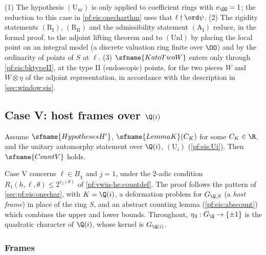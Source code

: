 \begin{remark}\label{pf:eis:countIrem}
(1) The hypothesis $(\mathrm{U}_{\mathrm{ur}})$ is only applied to coefficient rings with $e_\OO=1$; the reduction to this case in
\cref{pf:eis:onecharthm} uses that $\ell\nmid\ord\psi$.
(2) The rigidity statements $(\mathrm{R}_{\mathrm{I}})$, $(\mathrm{R}_{\mathrm{II}})$ and the admissibility statement $(\mathrm{A}_{\mathrm{I}})$ reduce, in the formal proof,
to the adjoint lifting theorem and to $(\mathrm{Unl})$ by placing the local point on an integral model (a discrete valuation
ring finite over $\OO$) and by the ordinarity of points of $S$ at $\ell$.
(3) $\sfname{KatoTwoW}$ enters only through \cref{pf:eis:bktypeII}, at the type II (endoscopic) points, for the two pieces $W$ and
$W\otimes\eta$ of the adjoint representation, in accordance with the description in \cref{sec:window:eis}.
\end{remark}

\subsection{Case V: host frames over \texorpdfstring{$\Q(i)$}{Q(i)}}\label{sec:pf:eis:countV}

\begin{theorem}\label{pf:eis:countV}
Assume $\sfname{HypothesesH'}$, $\sfname{LemmaK}(C_K)$ for some $C_K\in\R$, and the unitary automorphy statement over $\Q(i)$,
$(\mathrm{U}_i)$ (\cref{pf:eis:Ui}). Then $\sfname{CountV}$ holds.
\end{theorem}

Case V concerns $\ell\in B_\chi$ and $j=1$, under the $2$-adic condition $R_1(h,\ell,\theta)\le2^{c_2(\theta)}$ of
\cref{pf:vwin-he:countdef}. The proof follows the pattern of \cref{sec:pf:eis:onechar}, with $K=\Q(i)$, a deformation problem for
$G_{\Q,S}$ (a \emph{host frame}) in place of the ring $S$, and an abstract counting lemma (\cref{pf:eis:abscount}) which combines the
upper and lower bounds. Throughout, $\eta_4:G_\Q\to\{\pm1\}$ is the quadratic character of $\Q(i)$, whose kernel is $G_{\Q(i)}$.

\subsubsection{Frames}

